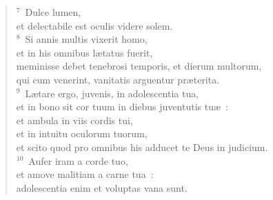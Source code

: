\begin{verse}${}^{7}$~Dulce lumen,\\ et delectabile est oculis videre solem.\\
${}^{8}$~Si annis multis vixerit homo,\\ et in his omnibus l\ae tatus fuerit,\\ meminisse debet tenebrosi temporis, et dierum multorum,\\ qui cum venerint, vanitatis arguentur pr\ae terita.\\
${}^{9}$~L\ae tare ergo, juvenis, in adolescentia tua,\\ et in bono sit cor tuum in diebus juventutis tu\ae~:\\ et ambula in viis cordis tui,\\ et in intuitu oculorum tuorum,\\ et scito quod pro omnibus his adducet te Deus in judicium.\\
${}^{10}$~Aufer iram a corde tuo,\\ et amove malitiam a carne tua~:\\ adolescentia enim et voluptas vana sunt.\end{verse}


